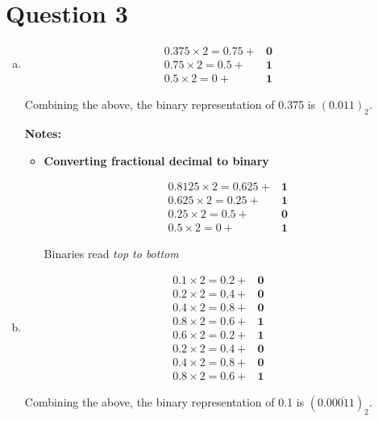 \documentclass[12pt]{article}
\begin{document}
\section*{Question 3}
\begin{enumerate}[a.]
    \item
    \setcounter{equation}{0}
    \begin{align}
        0.375 \times 2 = 0.75 + &\textbf{0}\\
        0.75 \times 2 = 0.5 + &\textbf{1}\\
        0.5 \times 2 = 0 + &\textbf{1}
    \end{align}

    Combining the above, the binary representation of 0.375 is $(0.011)_2$.

    \textbf{Notes:}
    \begin{itemize}
        \item \textbf{Converting fractional decimal to binary}

        \begin{align}
            0.8125 \times 2 = 0.625 + &\textbf{1}\\
            0.625 \times 2 = 0.25 + &\textbf{1}\\
            0.25 \times 2 = 0.5 + &\textbf{0}\\
            0.5 \times 2 = 0 + &\textbf{1}
        \end{align}

        Binaries read \textit{top to bottom}
    \end{itemize}

    \item

    \setcounter{equation}{0}
    \begin{align}
        0.1 \times 2 = 0.2 + &\textbf{0}\\
        0.2 \times 2 = 0.4 + &\textbf{0}\\
        0.4 \times 2 = 0.8 + &\textbf{0}\\
        0.8 \times 2 = 0.6 + &\textbf{1}\\
        0.6 \times 2 = 0.2 + &\textbf{1}\\
        0.2 \times 2 = 0.4 + &\textbf{0}\\
        0.4 \times 2 = 0.8 + &\textbf{0}\\
        0.8 \times 2 = 0.6 + &\textbf{1}
    \end{align}

    Combining the above, the binary representation of 0.1 is $(0.0\overline{0011})_2$.

\end{enumerate}
\end{document}
